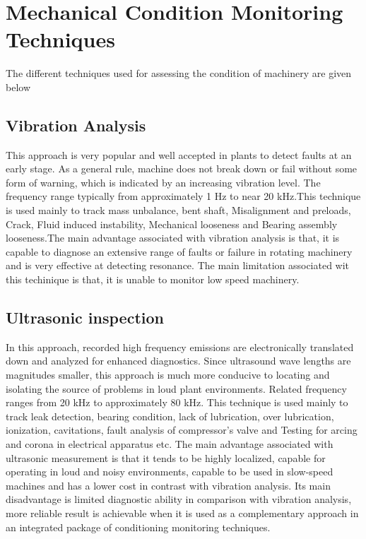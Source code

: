 \section{Mechanical Condition Monitoring Techniques}

The different techniques used for assessing the condition of machinery are given below

\subsection{Vibration Analysis}

This approach is very popular and well accepted in plants to detect faults at an early stage. As a general rule, machine does not break down or fail without some form of warning, which is indicated by an increasing vibration level. The frequency range typically from approximately 1 Hz to near 20 kHz.This technique is used mainly to track mass unbalance, bent shaft,  Misalignment and preloads, Crack, Fluid induced instability, Mechanical looseness and Bearing assembly looseness.The main advantage associated with vibration analysis is that, it is capable to diagnose an extensive range of faults or failure in rotating machinery and is very effective at detecting resonance. The main limitation associated wit this techinique is that, it is unable to monitor low speed machinery.

\subsection{Ultrasonic inspection }

In this approach, recorded high frequency emissions are electronically translated down and analyzed for enhanced diagnostics. Since ultrasound wave lengths are magnitudes smaller, this approach is much more conducive to locating and isolating the source of problems in loud plant environments. Related frequency ranges from 20 kHz to approximately 80 kHz.
This technique is used mainly to track leak detection, bearing condition, lack of lubrication, over lubrication, ionization, cavitations, fault analysis of compressor's valve and Testing for arcing and corona in electrical apparatus etc. 
The main advantage associated with ultrasonic measurement is that it tends to be highly localized, capable for operating in loud and noisy environments, capable to be used in slow-speed machines and has a lower cost in contrast with vibration analysis. 
Its main disadvantage is limited diagnostic ability in comparison with vibration analysis, more reliable result is achievable when it is used as a complementary approach in an integrated package of conditioning monitoring techniques.

